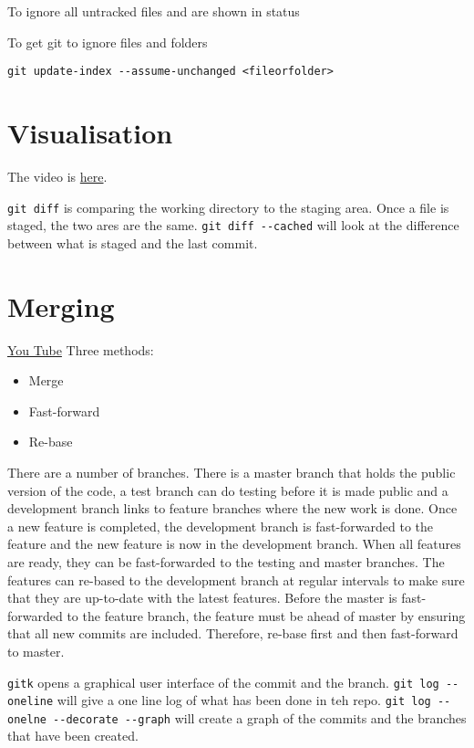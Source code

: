 \documentclass[11pt]{article} %
\begin{document}
To ignore all untracked files and are shown in status

To get git to ignore files and folders

\lstinline{git update-index --assume-unchanged <fileorfolder>}

\section{Visualisation}
The video is \href{https://www.youtube.com/watch?v=sGORc1eOVyE&feature=em-subs_digest}{here}. 

\lstinline{git diff} is comparing the working directory to the staging area. Once a file is staged, the two ares are the same. \lstinline{git diff --cached} will look at the difference between what is staged and the last commit.  
\section{Merging}
\href{https://www.youtube.com/watch?v=to6tIdy5rNc&feature=em-subs_digest-wl}{You Tube}
Three methods:
\begin{itemize}
\item Merge
\item Fast-forward
\item Re-base
\end{itemize}

There are a number of branches. There is a master branch that holds the public version of the code, a test branch can do testing before it is made public and a development branch links to feature branches where the new work is done.  Once a new feature is completed, the development branch is fast-forwarded to the feature and the new feature is now in the development branch.  When all features are ready, they can be fast-forwarded to the testing and master branches.  The features can re-based to the development branch at regular intervals to make sure
that they are up-to-date with the latest features. Before the master is fast-forwarded to the feature branch, the feature must be ahead of master by ensuring that all new commits are included. Therefore, re-base first and then fast-forward to master. 

\lstinline{gitk} opens a graphical user interface of the commit and the branch.  \lstinline{git log --oneline} will give a one line log of what has been done in teh repo. \lstinline{git log --onelne --decorate --graph} will create a graph of the commits and the branches that have been created. 
\end{document}
